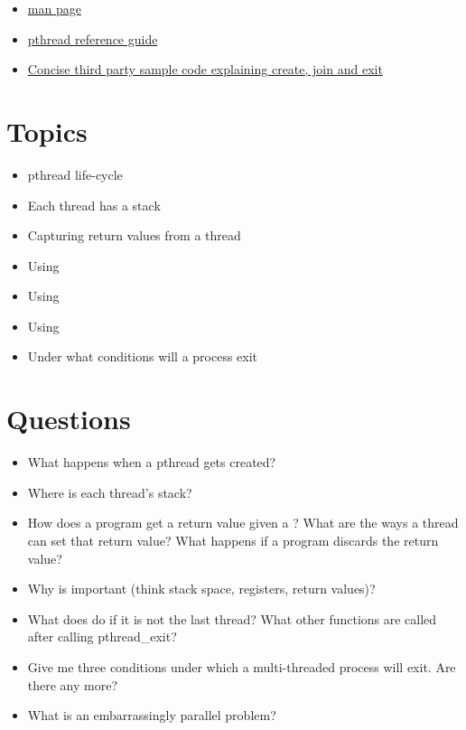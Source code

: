 \begin{itemize}
\item \href{http://man7.org/linux/man-pages/man3/pthread_create.3.html}{man page}
\item \href{http://man7.org/linux/man-pages/man7/pthreads.7.html}{pthread reference guide}
\item \href{http://www.thegeekstuff.com/2012/04/terminate-c-thread/}{Concise third party sample code explaining create, join and exit}
\end{itemize}

\section{Topics}

\begin{itemize}
\tightlist
\item
pthread life-cycle
\item
Each thread has a stack
\item
Capturing return values from a thread
\item
Using 
\item
Using 
\item
Using 
\item
Under what conditions will a process exit
\end{itemize}

\section{Questions}

\begin{itemize}
\tightlist
\item
What happens when a pthread gets created?
\item
Where is each thread's stack?
\item
How does a program get a return value given a ? What are the ways a thread can set that return value? What happens if a program discards the return value?
\item
Why is  important (think stack space, registers, return values)?
\item
What does  do if it is not the last thread? What other functions are called after calling pthread\_exit?
\item
Give me three conditions under which a multi-threaded process will exit. Are there any more?
\item
What is an embarrassingly parallel problem?
\end{itemize}



